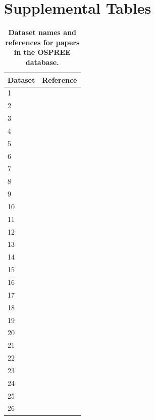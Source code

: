 \documentclass{article}
\begin{document}
\section* {Supplemental Tables}
\newpage
\begin{footnotesize} 

\begingroup\footnotesize
\begin{longtable}{p{}p{}}
\caption{\textbf{Dataset names and references for papers in the OSPREE database.}} \\ 
  \hline
Dataset & Reference \\ 
  \hline \endhead  \hline
1 & \citep{Basler:2012} \\ 
  2 & \citep{Basler:2014aa} \\ 
  3 & \citep{Biasi:2012} \\ 
  4 & \citep{Caffarra:2011a} \\ 
  5 & \citep{Caffarra:2011b} \\ 
  6 & \citep{Calme:1994aa} \\ 
  7 & \citep{Campbell:1975aa} \\ 
  8 & \citep{Chavarria:2009aa} \\ 
  9 & \citep{Cook:2000aa} \\ 
  10 & \citep{Falusi:2003aa} \\ 
  11 & \citep{Falusi:1990aa} \\ 
  12 & \citep{Falusi:1996aa} \\ 
  13 & \citep{Falusi:1997aa} \\ 
  14 & \citep{Ghelardini:2010aa} \\ 
  15 & \citep{Gianfagna:1985aa} \\ 
  16 & \citep{Gomory:2015aa} \\ 
  17 & \citep{Guak:1998aa} \\ 
  18 & \citep{guerriero:1990} \\ 
  19 & \citep{Heide:2012aa} \\ 
  20 & \citep{Heide:1993} \\ 
  21 & \citep{Heide:1993a} \\ 
  22 & \citep{Jones:2012} \\ 
  23 & \citep{Laube:2014a} \\ 
  24 & \citep{Laube:2014b} \\ 
  25 & \citep{Li:2005aa} \\ 
  26 & \citep{Linkosalo:2006aa} \\ 

\end{longtable}
\end{footnotesize}
\end{document}
